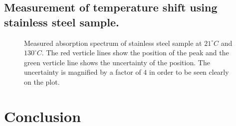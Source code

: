 \documentclass[aps,twocolumn,secnumarabic,balancelastpage,amsmath,amssymb,nofootinbib]{revtex4}
\begin{document}
\subsection{Measurement of temperature shift using stainless steel sample.}
\begin{figure}
  \caption{Measured absorption spectrum of stainless steel sample at  $21^{\circ}C$ and  $130^{\circ}C$. The red verticle lines show the position of the peak and the green verticle line shows the uncertainty of the position. The uncertainty is magnified by a factor of $4$ in order to be seen clearly on the plot.}
  \label{temp_raw}
\end{figure}

\section{Conclusion}


\end{document}
